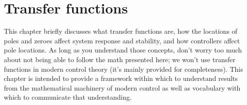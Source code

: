 
\chapter{Transfer functions}

This chapter briefly discusses what transfer functions are, how the locations of
poles and zeroes affect \gls{system response} and stability, and how controllers
affect pole locations. As long as you understand those concepts, don't worry too
much about not being able to follow the math presented here; we won't use
transfer functions in modern control theory (it's mainly provided for
completeness). This chapter is intended to provide a framework within which to
understand results from the mathematical machinery of modern control as well as
vocabulary with which to communicate that understanding.

\renewcommand*{\chapterpath}{\partpath/transfer-functions}





